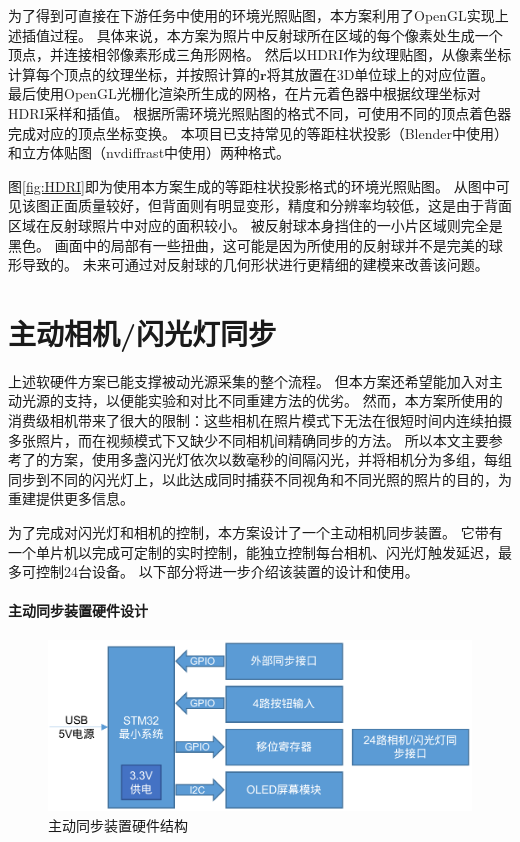 为了得到可直接在下游任务中使用的环境光照贴图，本方案利用了OpenGL实现上述插值过程。
具体来说，本方案为照片中反射球所在区域的每个像素处生成一个顶点，并连接相邻像素形成三角形网格。
然后以HDRI作为纹理贴图，从像素坐标计算每个顶点的纹理坐标，并按照计算的$\mathbf{r}$将其放置在3D单位球上的对应位置。
最后使用OpenGL光栅化渲染所生成的网格，在片元着色器中根据纹理坐标对HDRI采样和插值。
根据所需环境光照贴图的格式不同，可使用不同的顶点着色器完成对应的顶点坐标变换。
本项目已支持常见的等距柱状投影（Blender中使用）和立方体贴图（nvdiffrast中使用）两种格式。

图\ref{fig:HDRI}即为使用本方案生成的等距柱状投影格式的环境光照贴图。
从图中可见该图正面质量较好，但背面则有明显变形，精度和分辨率均较低，这是由于背面区域在反射球照片中对应的面积较小。
被反射球本身挡住的一小片区域则完全是黑色。
画面中的局部有一些扭曲，这可能是因为所使用的反射球并不是完美的球形导致的。
未来可通过对反射球的几何形状进行更精细的建模来改善该问题。

\section{主动相机/闪光灯同步}

上述软硬件方案已能支撑被动光源采集的整个流程。
但本方案还希望能加入对主动光源的支持，以便能实验和对比不同重建方法的优劣。
然而，本方案所使用的消费级相机带来了很大的限制：这些相机在照片模式下无法在很短时间内连续拍摄多张照片，而在视频模式下又缺少不同相机间精确同步的方法。
所以本文主要参考了\citet{FyffeGTGD16}的方案，使用多盏闪光灯依次以数毫秒的间隔闪光，并将相机分为多组，每组同步到不同的闪光灯上，以此达成同时捕获不同视角和不同光照的照片的目的，为重建提供更多信息。

为了完成对闪光灯和相机的控制，本方案设计了一个主动相机同步装置。
它带有一个单片机以完成可定制的实时控制，能独立控制每台相机、闪光灯触发延迟，最多可控制24台设备。
以下部分将进一步介绍该装置的设计和使用。

\paragraph{主动同步装置硬件设计}

\begin{figure}
\centering
\includegraphics[width=0.8\linewidth]{figures/active_sync.png}
\caption{主动同步装置硬件结构}
\label{fig:active_sync}
\end{figure}


